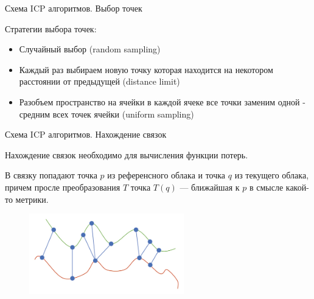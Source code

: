 \documentclass[6pt,pdf,utf8,russian]{beamer}
\begin{document}
\begin{frame}[fragile]{Схема ICP алгоритмов. Выбор точек}

    \begin{block}{}
        Стратегии выбора точек:
        \begin{itemize}
            \item Случайный выбор (random sampling)
            \item Каждый раз выбираем новую точку которая находится на некотором расстоянии от предыдущей (distance limit)
            \item Разобъем пространство на ячейки в каждой ячеке все точки заменим одной - средним всех точек ячейки (uniform sampling)
        \end{itemize}
    \end{block}

\end{frame}

\begin{frame}[fragile]{Схема ICP алгоритмов. Нахождение связок}

    \begin{block}{}
        Нахождение связок необходимо для вычисления функции потерь.
    \end{block}

    \pause

    \begin{block}{}
        В связку попадают точка $p$ из референсного облака и точка $q$ из текущего облака, причем
        просле преобразования $T$ точка $T(q)$ --- ближайшая к $p$ в смысле какой-то метрики.
    \end{block}

    \begin{figure}
        \includegraphics[width=0.6\textwidth]{images/correspondence_example.jpg}
    \end{figure}


\end{frame}
\end{document}

